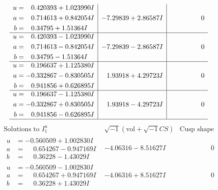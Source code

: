 \documentclass[1p]{elsarticle_modified}
\theoremstyle{definition}
\newcommand{\I}{\sqrt{-1}}
\begin{document}
$$\begin{array}{c|c|c}
\begin{aligned}
u &= \phantom{-}0.420393 + 1.023990 I \\
a &= \phantom{-}0.714613 + 0.842054 I \\
b &= \phantom{-}0.34795 + 1.51364 I\end{aligned}
 & -7.29839 + 2.86587 I & \phantom{-0.000000 } 0 \\ \hline\begin{aligned}
u &= \phantom{-}0.420393 - 1.023990 I \\
a &= \phantom{-}0.714613 - 0.842054 I \\
b &= \phantom{-}0.34795 - 1.51364 I\end{aligned}
 & -7.29839 - 2.86587 I & \phantom{-0.000000 } 0 \\ \hline\begin{aligned}
u &= \phantom{-}0.196637 + 1.125380 I \\
a &= -0.332867 - 0.830505 I \\
b &= \phantom{-}0.941856 + 0.626895 I\end{aligned}
 & \phantom{-}1.93918 + 4.29723 I & \phantom{-0.000000 } 0 \\ \hline\begin{aligned}
u &= \phantom{-}0.196637 - 1.125380 I \\
a &= -0.332867 + 0.830505 I \\
b &= \phantom{-}0.941856 - 0.626895 I\end{aligned}
 & \phantom{-}1.93918 - 4.29723 I & \phantom{-0.000000 } 0\\
 \hline 
 \end{array}$$\newpage$$\begin{array}{c|c|c}  
\text{Solutions to }I^u_{1}& \I (\text{vol} + \sqrt{-1}CS) & \text{Cusp shape}\\
 \hline 
\begin{aligned}
u &= -0.560509 + 1.002830 I \\
a &= \phantom{-}0.654267 - 0.947169 I \\
b &= \phantom{-}0.36228 - 1.43029 I\end{aligned}
 & -4.06316 - 8.51627 I & \phantom{-0.000000 } 0 \\ \hline\begin{aligned}
u &= -0.560509 - 1.002830 I \\
a &= \phantom{-}0.654267 + 0.947169 I \\
b &= \phantom{-}0.36228 + 1.43029 I\end{aligned}
 & -4.06316 + 8.51627 I & \phantom{-0.000000 } 0 \\ \hline\begin{aligned}

\end{aligned}
\end{array}$$
\end{document}
